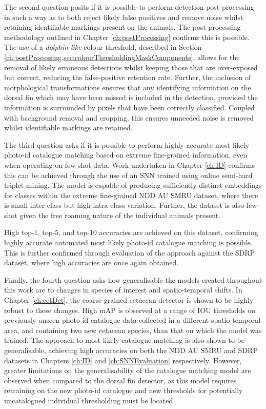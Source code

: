 The second question posits if it is possible to perform detection post-processing in such a way as to both reject likely false positives and remove noise whilst retaining identifiable markings present on the animals. The post-processing methodology outlined in Chapter \ref{ch:postProcessing} confirms this is possible. The use of a \textit{dolphin-like} colour threshold, described in Section \ref{ch:postProcessing,sec:colourThresholdingMaskComponents}, allows for the removal of likely erroneous detections whilst keeping those that are over-exposed but correct, reducing the false-positive retention rate. Further, the inclusion of morphological transformations ensures that any identifying information on the dorsal fin which may have been missed is included in the detection, provided the information is surrounded by pixels that have been correctly classified. Coupled with background removal and cropping, this ensures unneeded noise is removed whilst identifiable markings are retained. 

The third question asks if it is possible to perform highly accurate most likely photo-id catalogue matching based on extreme fine-grained information, even when operating on few-shot data. Work undertaken in Chapter \ref{ch:ID} confirms this can be achieved through the use of an SNN trained using online semi-hard triplet mining. The model is capable of producing sufficiently distinct embeddings for classes within the extreme fine-grained NDD AU SMRU dataset, where there is small inter-class but high intra-class variation. Further, the dataset is also few-shot given the free roaming nature of the individual animals present. 

High top-1, top-5, and top-10 accuracies are achieved on this dataset, confirming highly accurate automated most likely photo-id catalogue matching is possible. This is further confirmed through evaluation of the approach against the SDRP dataset, where high accuracies are once again obtained. 

Finally, the fourth question asks how generalisable the models created throughout this work are to changes in species of interest and spatio-temporal shifts. In Chapter \ref{ch:cetDet}, the coarse-grained cetacean detector is shown to be highly robust to these changes. High mAP is observed at a range of IOU thresholds on previously unseen photo-id catalogue data collected in a different spatio-temporal area, and containing two new cetacean species, than that on which the model was trained. The approach to most likely catalogue matching is also shown to be generalisable, achieving high accuracies on both the NDD AU SMRU and SDRP datasets in Chapters \ref{ch:ID} and \ref{ch:SNNEvaluation} respectively. However, greater limitations on the generalisability of the catalogue matching model are observed when compared to the dorsal fin detector, as this model requires retraining on the new photo-id catalogue and new thresholds for potentially uncatalogued individual thresholding must be located. 

